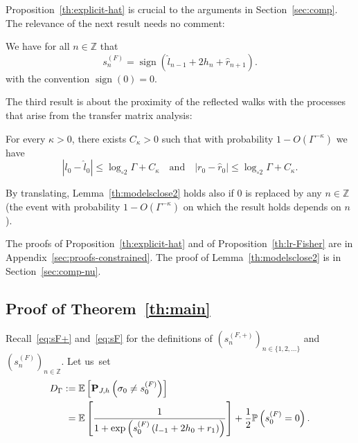 \documentclass[AHL,Unicode,longabstracts,published]{cedram}
\newcommand{\bP}{\mathbf{P}}
\newcommand{\bbE}{\mathbb{E}}
\newcommand{\bbP}{\mathbb{P}}
\newcommand{\bbZ}{\mathbb{Z}}
\newcommand{\gG}{\Gamma}
\newcommand{\gs}{\sigma}
\newcommand{\ls}{\widehat{l}}
\newcommand{\rs}{\widehat{r}}
\newcommand{\loglog}{\log_{\circ 2}}
\DeclareMathOperator{\sign}{\mathrm{sign}}
\newcommand*{\Mk}{\mkern -2mu}
\newcommand*{\MK}{\mkern 2mu}
\begin{document}
\pagebreak

Proposition~\ref{th:explicit-hat} is crucial to the arguments in Section~\ref{sec:comp}. The relevance of the next result needs no comment:
\begin{prop}\label{th:lr-Fisher}
We have for all $n\in\bbZ$ that
\begin{equation}\label{eq:lr-Fisher}
s^{(F)}_n= \sign\left(\ls_{n-1}+2h_n + \rs_{n+1} \right).
\end{equation}
with the convention $\sign(0)=0$.
\end{prop}


The third result is about the proximity of the reflected walks with the processes that arise from the transfer matrix analysis:


\begin{lemm}\label{th:modelsclose2}
For every $\kappa>0$, there exists $C_\kappa>0$ such that with probability $1-O(\Gamma^{-\kappa})$ we have
\begin{equation}\label{lapproxls}
|l_0-\ls_0|\le \loglog \Gamma + C_\kappa\quad \text{and} \quad \left| r_0-\rs_0\right|\le \loglog \Gamma + C_\kappa.
\end{equation}
\end{lemm}


By translating, Lemma~\ref{th:modelsclose2} holds also if $0$ is replaced by any $n\in \bbZ$ (the event with probability $1-O(\Gamma^{-\kappa})$ on which the result holds depends on $n$).


The proofs of Proposition~\ref{th:explicit-hat} and of Proposition~\ref{th:lr-Fisher} are in Appendix~\ref{sec:proofs-constrained}. The proof of Lemma~\ref{th:modelsclose2} is in Section~\ref{sec:comp-nu}.


\subsection{Proof of Theorem~\ref{th:main}}\label{sec:mainproof}

Recall~\eqref{eq:sF+} and~\eqref{eq:sF} for the definitions of $(s^{(F, +)}_n)_{n\in \{1,2, \dots\}}$ and $(s^{(F)}_n)_{n\in \bbZ}$. Let us~set
\begin{equation}\label{eq:DgGdef}
\begin{aligned}[t]
D_\gG \,\MK &\!\Mk:=  \bbE\left[\bP_{J, h}\left(\gs_0\neq s^{(F)}_0\right)\right]\\ &= \bbE \left[
\frac {1}{1+ \exp\left(s^{(F)}_0\left(l_{-1} +2h_0+ r_{1}\right)\right)}
\right] + \frac12 \bbP \left(s^{(F)}_0 =0 \right).
\end{aligned}
\end{equation}
\end{document}
